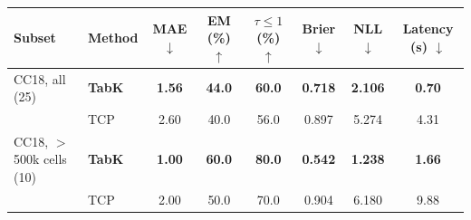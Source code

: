 \begin{tabular}{l l c c c c c c}
\toprule
Subset & Method & MAE $\downarrow$ & EM (\%) $\uparrow$ & $\tau \leq 1$ (\%) $\uparrow$ & Brier $\downarrow$ & NLL $\downarrow$ & Latency (s) $\downarrow$ \\
\midrule
CC18, all (25) & \textbf{TabK} & \textbf{1.56} & \textbf{44.0} & \textbf{60.0} & \textbf{0.718} & \textbf{2.106} & \textbf{0.70} \\
 & TCP & 2.60 & 40.0 & 56.0 & 0.897 & 5.274 & 4.31 \\
\midrule
CC18, $>$500k cells (10) & \textbf{TabK} & \textbf{1.00} & \textbf{60.0} & \textbf{80.0} & \textbf{0.542} & \textbf{1.238} & \textbf{1.66} \\
 & TCP & 2.00 & 50.0 & 70.0 & 0.904 & 6.180 & 9.88 \\
\bottomrule
\end{tabular}
